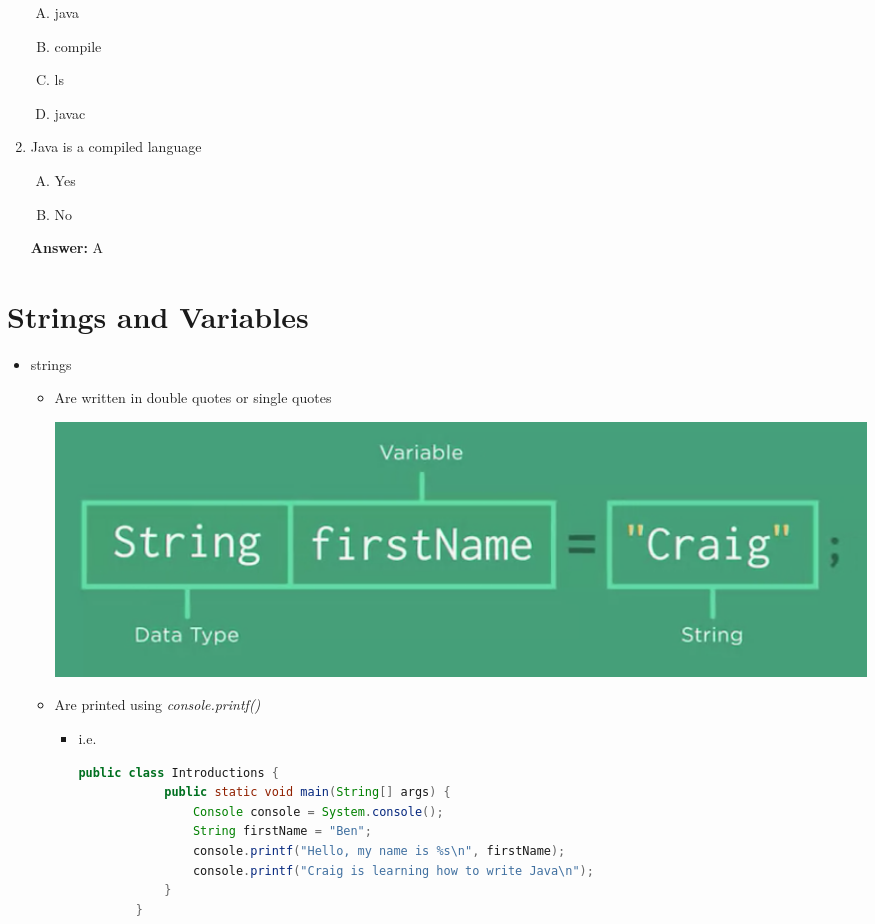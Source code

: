 \documentclass[12pt]{article}
\begin{document}
\begin{enumerate}[1.]
    \begin{enumerate}[A.]
        \item java
        \item compile
        \item ls
        \item javac
    \end{enumerate}

    \item

    Java is a compiled language

    \bigskip

    \begin{enumerate}[A.]
        \item Yes
        \item No
    \end{enumerate}

    \bigskip

    \textbf{Answer:} A

\end{enumerate}

\bigskip

\section{Strings and Variables}

\bigskip

\begin{itemize}
    \item strings
    \begin{itemize}
        \item Are written in double quotes or single quotes

        \begin{center}
        \includegraphics[width=0.7\linewidth]{images/part_1_1.png}
        \end{center}

        \item Are printed using \textit{console.printf()}
        \begin{itemize}
            \item i.e.

        \begin{lstlisting}[language=java]
        public class Introductions {
            public static void main(String[] args) {
                Console console = System.console();
                String firstName = "Ben";
                console.printf("Hello, my name is %s\n", firstName);
                console.printf("Craig is learning how to write Java\n");
            }
        }
        \end{lstlisting}
    \end{itemize}
\end{itemize}

\end{itemize}
\end{document}
